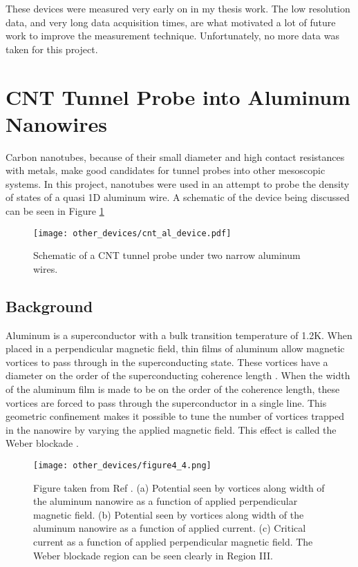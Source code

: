 These devices were measured very early on in my thesis work. The low resolution data, and very long data acquisition times, are what motivated a lot of future work to improve the measurement technique. Unfortunately, no more data was taken for this project.

\section{CNT Tunnel Probe into Aluminum Nanowires}

Carbon nanotubes, because of their small diameter and high contact resistances with metals, make good candidates for tunnel probes into other mesoscopic systems. In this project, nanotubes were used in an attempt to probe the density of states of a quasi 1D aluminum wire. A schematic of the device being discussed can be seen in Figure \ref{fig:cnt_al_device}

\begin{figure}
    \centering
    \texttt{[image: other\_devices/cnt\_al\_device.pdf]}
    \caption{Schematic of a CNT tunnel probe under two narrow aluminum wires.}
    \label{fig:cnt_al_device}
\end{figure}

\subsection{Background}

Aluminum is a superconductor with a bulk transition temperature of 1.2K. When placed in a perpendicular magnetic field, thin films of aluminum allow magnetic vortices to pass through in the superconducting state. These vortices have a diameter on the order of the superconducting coherence length \cite{Tinkham1996}. When the width of the aluminum film is made to be on the order of the coherence length, these vortices are forced to pass through the superconductor in a single line. This geometric confinement makes it possible to tune the number of vortices trapped in the nanowire by varying the applied magnetic field. This effect is called the Weber blockade \cite{Pekker2011}.

\begin{figure}
    \centering
    \texttt{[image: other\_devices/figure4\_4.png]}
    \caption{Figure taken from Ref \cite{Morgan-Wall2015}. (a) Potential seen by vortices along width of the aluminum nanowire as a function of applied perpendicular magnetic field. (b) Potential seen by vortices along width of the aluminum nanowire as a function of applied current. (c) Critical current as a function of applied perpendicular magnetic field. The Weber blockade region can be seen clearly in Region III.}
    \label{fig:aluminum_potential}
\end{figure}

